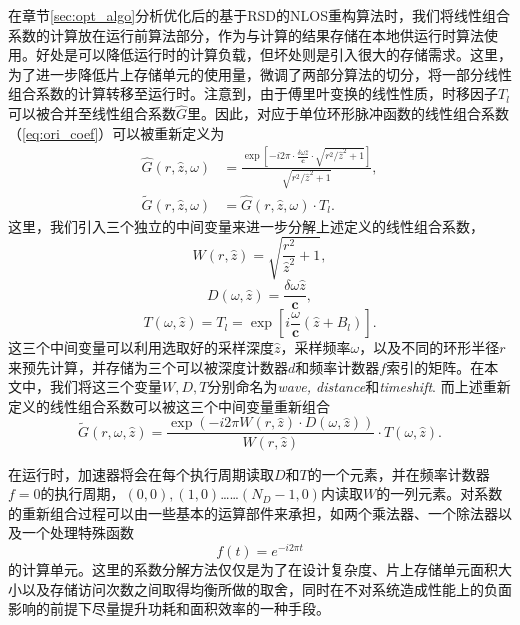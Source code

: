 \documentclass[master]{shtthesis}             %
\begin{document}
在章节\ref{sec:opt_algo}分析优化后的基于RSD的NLOS重构算法时，我们将线性组合系数的计算放在运行前算法部分，作为与计算的结果存储在本地供运行时算法使用。好处是可以降低运行时的计算负载，但坏处则是引入很大的存储需求。这里，为了进一步降低片上存储单元的使用量，微调了两部分算法的切分，将一部分线性组合系数的计算转移至运行时。注意到，由于傅里叶变换的线性性质，时移因子$T_l$可以被合并至线性组合系数$\hat{G}$里。因此，对应于单位环形脉冲函数的线性组合系数（\ref{eq:ori_coef}）可以被重新定义为
\begin{align} \label{eq:coef}
    \hat{G}(r, \hat{z}, \omega) & = \frac{\exp{\left[-i2\pi\cdot\frac{\delta \omega\hat{z}}{\mathbf{c}}\cdot\sqrt{r^2/\hat{z}^2+1}\right]}}{\sqrt{r^2/\hat{z}^2+1}},\\
    \tilde{G}(r, \hat{z}, \omega) & = \hat{G}(r, \hat{z}, \omega) \cdot T_l .
\end{align}
这里，我们引入三个独立的中间变量来进一步分解上述定义的线性组合系数，
\begin{equation}
    W(r, \hat{z}) = \sqrt{\frac{r^2}{\hat{z}^2}+1},
\end{equation}
\begin{equation}
    D(\omega, \hat{z}) = \frac{\delta \omega \hat{z}}{\mathbf{c}},
\end{equation}
\begin{equation}
    T(\omega, \hat{z}) = T_l= \exp \left[ i\frac{\omega}{\mathbf{c}}(\hat{z}+B_l) \right].
\end{equation}
这三个中间变量可以利用选取好的采样深度$\hat{z}$，采样频率$\omega$，以及不同的环形半径$r$来预先计算，并存储为三个可以被深度计数器$d$和频率计数器$f$索引的矩阵。在本文中，我们将这三个变量$W,D,T$分别命名为\textit{wave, distance}和\textit{timeshift}. 而上述重新定义的线性组合系数可以被这三个中间变量重新组合
\begin{equation}
    \tilde{G}(r, \omega, \hat{z}) = \frac{\exp(-i2\pi W(r, \hat{z}) \cdot D(\omega, \hat{z}))}{W(r, \hat{z})} \cdot T(\omega, \hat{z}).
\end{equation}

在运行时，加速器将会在每个执行周期读取$D$和$T$的一个元素，并在频率计数器$f=0$的执行周期，$(0,0),(1,0)$……$(N_D-1,0)$内读取$W$的一列元素。对系数的重新组合过程可以由一些基本的运算部件来承担，如两个乘法器、一个除法器以及一个处理特殊函数
\begin{equation}
    f(t) = e^{-i2\pi t}
\end{equation}
的计算单元。这里的系数分解方法仅仅是为了在设计复杂度、片上存储单元面积大小以及存储访问次数之间取得均衡所做的取舍，同时在不对系统造成性能上的负面影响的前提下尽量提升功耗和面积效率的一种手段。
\end{document}
